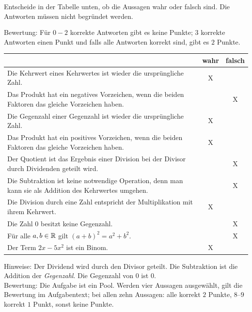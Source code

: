 \documentclass[11pt]{exam}
\begin{document}
\begin{questions}
\question[2] %
Entscheide in der Tabelle unten, ob die Aussagen wahr oder falsch sind. Die Antworten müssen nicht begründet werden.\newline
\begin{small}
    Bewertung: Für $0-2$ korrekte Antworten gibt es keine Punkte; $3$ korrekte Antworten einen Punkt und falls alle Antworten korrekt sind, gibt es $2$ Punkte.
\end{small}
{\begin{solution}
	\begingroup
	\renewcommand{\arraystretch}{1.5}
	\begin{table}[H]
		\centering
		\begin{tabular}{|p{12cm}|c|c|}\hline
			& wahr & falsch \\\hline
			Die Kehrwert eines Kehrwertes ist wieder die ursprüngliche Zahl. & X & \\\hline
			Das Produkt hat ein negatives Vorzeichen, wenn die beiden Faktoren das gleiche Vorzeichen haben. & & X \\\hline
			Die Gegenzahl einer Gegenzahl ist wieder die ursprüngliche Zahl. & X & \\\hline
			Das Produkt hat ein positives Vorzeichen, wenn die beiden Faktoren das gleiche Vorzeichen haben. & X & \\\hline
			Der Quotient ist das Ergebnis einer Division bei der Divisor durch Dividenden geteilt wird. & & X \\\hline
			Die Subtraktion ist keine notwendige Operation, denn man kann sie als Addition des Kehrwertes umgehen. & & X \\\hline
			Die Division durch eine Zahl entspricht der Multiplikation mit ihrem Kehrwert. & X & \\\hline
			Die Zahl $0$ besitzt keine Gegenzahl. & & X \\\hline
			Für alle $a,b\in\mathbb{R}$ gilt $(a+b)^2=a^2+b^2$. & & X \\\hline
			Der Term $2x-5x^2$ ist ein Binom. & X & \\\hline
		\end{tabular}
	\end{table}
	\endgroup
	Hinweise: Der Dividend wird durch den Divisor geteilt. Die Subtraktion ist die Addition der \emph{Gegenzahl}. Die Gegenzahl von $0$ ist $0$.\\
	Bewertung: Die Aufgabe ist ein Pool. Werden vier Aussagen ausgewählt, gilt die Bewertung im Aufgabentext; bei allen zehn Aussagen: alle korrekt $2$ Punkte, $8$--$9$ korrekt $1$ Punkt, sonst keine Punkte.

\end{solution}}
\end{questions}
\end{document}
